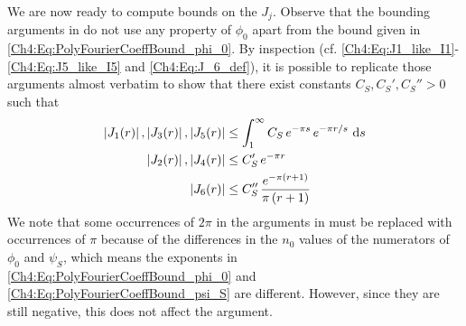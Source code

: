 We are now ready to compute bounds on the $J_j$. Observe that the bounding arguments in  do not use any property of $\phi_0$ apart from the bound given in \eqref{Ch4:Eq:PolyFourierCoeffBound_phi_0}. By inspection (cf. \eqref{Ch4:Eq:J1_like_I1}-\eqref{Ch4:Eq:J5_like_I5} and \eqref{Ch4:Eq:J_6_def}), it is possible to replicate those arguments almost verbatim to show that there exist constants $C_S, C_S', C_S'' > 0$ such that
\begin{align}
    \left\lvert J_1(r) \right\rvert, \left\lvert J_3(r) \right\rvert, \left\lvert J_5(r) \right\rvert &\leq \int_{1}^{\infty} C_S \, e^{-\pi s} \, e^{- \pi r/s} \, \operatorname{d}\!{s} \label{Ch4:Eq:Bound_J1_J5} \\
    \left\lvert J_2(r) \right\rvert, \left\lvert J_4(r) \right\rvert &\leq C_S' \, e^{-\pi r} \label{Ch4:Eq:Bound_J_2} \\
    \left\lvert J_6(r) \right\rvert &\leq C_S'' \, \frac{e^{-\pi\left( r + 1 \right)}}{\pi\left( r + 1 \right)} \label{Ch4:Eq:Bound_J_6}
\end{align}
We note that some occurrences of $2\pi$ in the arguments in  must be replaced with occurrences of $\pi$ because of the differences in the $n_0$ values of the numerators of $\phi_0$ and $\psi_S$, which means the exponents in \eqref{Ch4:Eq:PolyFourierCoeffBound_phi_0} and \eqref{Ch4:Eq:PolyFourierCoeffBound_psi_S} are different. However, since they are still negative, this does not affect the argument.

